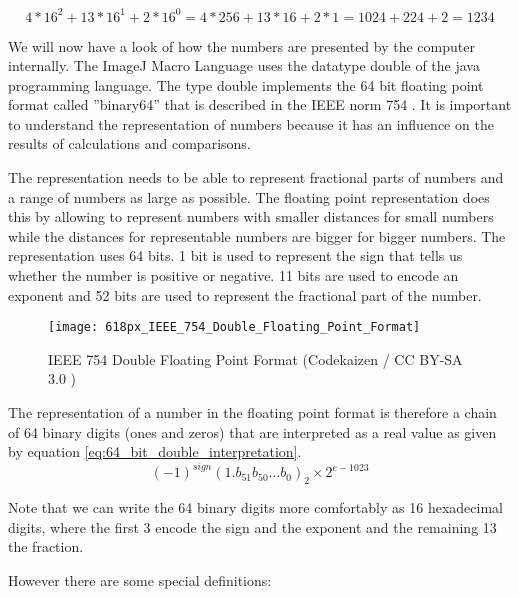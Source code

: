 \begin{equation}
4 * 16^{2} + 13 * 16^{1} + 2 * 16^{0} = 4 * 256 + 13 * 16 + 2 * 1 = 1024 + 224 + 2 = 1234
\end{equation}

We will now have a look of how the numbers are presented by the computer internally. The ImageJ Macro Language uses the datatype double of the java programming language. The type double implements the 64 bit floating point format called ''binary64'' that is described in the IEEE norm 754 \cite{_754-2008_2008}. It is important to understand the representation of numbers because it has an influence on the results of calculations and comparisons.

The representation needs to be able to represent fractional parts of numbers and a range of numbers as large as possible. The floating point representation does this by allowing to represent numbers with smaller distances for small numbers while the distances for representable numbers are bigger for bigger numbers. The representation uses 64 bits. 1 bit is used to represent the sign that tells us whether the number is positive or negative. 11 bits are used to encode an exponent and 52 bits are used to represent the fractional part of the number.  

\begin{figure}[h!]
  \centering
    \texttt{[image: 618px\_IEEE\_754\_Double\_Floating\_Point\_Format]}
    \caption[IEEE 754 Double Floating Point Format]{IEEE 754 Double Floating Point Format (Codekaizen / CC BY-SA 3.0 \cite{website:double_floating_point_image})}
    \label{double_floating_point_format}
\end{figure}

The representation of a number in the floating point format is therefore a chain of 64 binary digits (ones and zeros) that are interpreted as a real value as given by equation \ref{eq:64_bit_double_interpretation}.
\begin{equation} \label{eq:64_bit_double_interpretation}
(-1)^{sign}(1.b_{51}b_{50}...b_{0})_{2} \times 2^{e-1023} 
\end{equation}

Note that we can write the 64 binary digits more comfortably as 16 hexadecimal digits, where the first 3 encode the sign and the exponent and the remaining 13 the fraction. 

However there are some special definitions:

